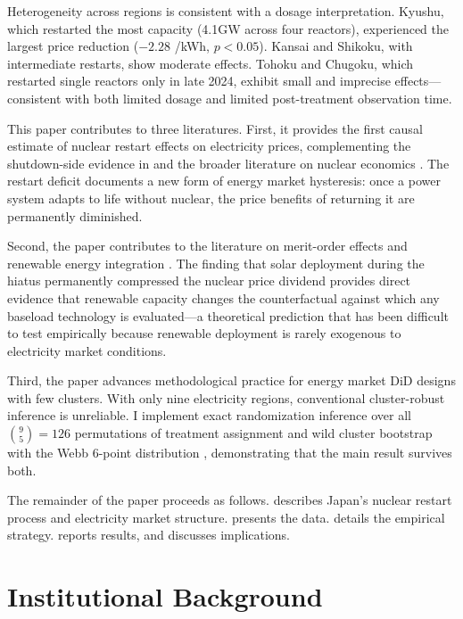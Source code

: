 \documentclass[12pt]{article}
\newcommand{\yen}{\textyen}
\begin{document}
Heterogeneity across regions is consistent with a dosage interpretation. Kyushu, which restarted the most capacity (4.1GW across four reactors), experienced the largest price reduction ($-2.28$ \yen/kWh, $p<0.05$). Kansai and Shikoku, with intermediate restarts, show moderate effects. Tohoku and Chugoku, which restarted single reactors only in late 2024, exhibit small and imprecise effects---consistent with both limited dosage and limited post-treatment observation time.

This paper contributes to three literatures. First, it provides the first causal estimate of nuclear restart effects on electricity prices, complementing the shutdown-side evidence in \citet{Neidell2021} and the broader literature on nuclear economics \citep{Davis2012, Jarvis2022}. The restart deficit documents a new form of energy market hysteresis: once a power system adapts to life without nuclear, the price benefits of returning it are permanently diminished.

Second, the paper contributes to the literature on merit-order effects and renewable energy integration \citep{Cludius2014, Ketterer2014, Paraschiv2014}. The finding that solar deployment during the hiatus permanently compressed the nuclear price dividend provides direct evidence that renewable capacity changes the counterfactual against which any baseload technology is evaluated---a theoretical prediction that has been difficult to test empirically because renewable deployment is rarely exogenous to electricity market conditions.

Third, the paper advances methodological practice for energy market DiD designs with few clusters. With only nine electricity regions, conventional cluster-robust inference is unreliable. I implement exact randomization inference over all $\binom{9}{5} = 126$ permutations of treatment assignment and wild cluster bootstrap with the Webb 6-point distribution \citep{Webb2023}, demonstrating that the main result survives both.

The remainder of the paper proceeds as follows.  describes Japan's nuclear restart process and electricity market structure.  presents the data.  details the empirical strategy.  reports results, and  discusses implications.


\section{Institutional Background}
\label{sec:background}
\end{document}
